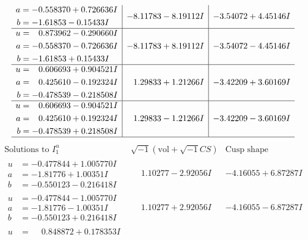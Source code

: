 \documentclass[1p]{elsarticle_modified}
\theoremstyle{definition}
\newcommand{\I}{\sqrt{-1}}
\begin{document}
$$\begin{array}{c|c|c}
\begin{aligned}
a &= -0.558370 + 0.726636 I \\
b &= -1.61853 - 0.15433 I\end{aligned}
 & -8.11783 - 8.19112 I & -3.54072 + 4.45146 I \\ \hline\begin{aligned}
u &= \phantom{-}0.873962 - 0.290660 I \\
a &= -0.558370 - 0.726636 I \\
b &= -1.61853 + 0.15433 I\end{aligned}
 & -8.11783 + 8.19112 I & -3.54072 - 4.45146 I \\ \hline\begin{aligned}
u &= \phantom{-}0.606693 + 0.904521 I \\
a &= \phantom{-}0.425610 - 0.192324 I \\
b &= -0.478539 - 0.218508 I\end{aligned}
 & \phantom{-}1.29833 + 1.21266 I & -3.42209 + 3.60169 I \\ \hline\begin{aligned}
u &= \phantom{-}0.606693 - 0.904521 I \\
a &= \phantom{-}0.425610 + 0.192324 I \\
b &= -0.478539 + 0.218508 I\end{aligned}
 & \phantom{-}1.29833 - 1.21266 I & -3.42209 - 3.60169 I\\
 \hline 
 \end{array}$$\newpage$$\begin{array}{c|c|c}  
\text{Solutions to }I^u_{1}& \I (\text{vol} + \sqrt{-1}CS) & \text{Cusp shape}\\
 \hline 
\begin{aligned}
u &= -0.477844 + 1.005770 I \\
a &= -1.81776 + 1.00351 I \\
b &= -0.550123 - 0.216418 I\end{aligned}
 & \phantom{-}1.10277 - 2.92056 I & -4.16055 + 6.87287 I \\ \hline\begin{aligned}
u &= -0.477844 - 1.005770 I \\
a &= -1.81776 - 1.00351 I \\
b &= -0.550123 + 0.216418 I\end{aligned}
 & \phantom{-}1.10277 + 2.92056 I & -4.16055 - 6.87287 I \\ \hline\begin{aligned}
u &= \phantom{-}0.848872 + 0.178353 I \\

\end{aligned}
\end{array}$$
\end{document}
